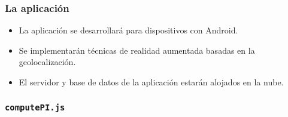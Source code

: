 
\begin{frame}
	\frametitle{La aplicación \ULLAR{}}
	\begin{itemize}
		\item La aplicación se desarrollará para dispositivos con Android. 
		\item Se implementarán técnicas de realidad aumentada basadas en la geolocalización.
		\item El servidor y base de datos de la aplicación estarán alojados en la nube.
	\end{itemize}
	\endblock{}
\end{frame}


\begin{frame}
\end{frame}


\begin{frame}
	\frametitle{\texttt{computePI.js}}
	
\end{frame}

         
